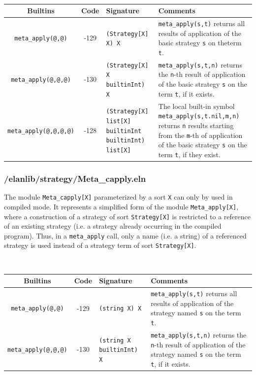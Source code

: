 ~\\
\begin{tabular}{|c|c|p{5cm}|p{5cm}|}
\hline
{\bf Builtins} & {\bf Code} & {\bf Signature} & {\bf Comments} \\
\hline
\hline
{\tt meta\_apply(@,@)}          & -129 & {\tt (Strategy[X] X) X} & {\tt meta\_apply(s,t)} returns all results of application of the basic strategy {\tt s} on theterm {\tt t}.\\
{\tt meta\_apply(@,@,@)}        & -130 & {\tt (Strategy[X] X builtinInt) X} & {\tt meta\_apply(s,t,n)} returns the {\tt n}-th result of application of the basic strategy {\tt s} on the term {\tt t}, if it exists.\\
{\tt meta\_apply(@,@,@,@)}      & -128 & {\tt (Strategy[X] list[X] builtinInt builtinInt) list[X]} & The local built-in symbol {\tt meta\_apply(s,t.nil,m,n)} returns {\tt n} results starting from the {\tt m}-th of application of the basic strategy {\tt s} on the term {\tt t}, if they exist.\\
\hline
\end{tabular}


\subsubsection{/elanlib/strategy/Meta\_capply.eln}


The module {\tt Meta\_capply[X]} parameterized by a sort {\tt X} can
only by used in compiled mode.  It represents a simplified form of the
module {\tt Meta\_apply[X]}, where a construction of a strategy of
sort {\tt Strategy[X]} is restricted to a reference of an existing
strategy (i.e. a strategy already occurring in the compiled program).
Thus, in a {\tt meta\_apply} call, only a name (i.e. a string) of a
referenced strategy is used instead of a strategy term of sort 
{\tt   Strategy[X]}.

~\\
\begin{tabular}{|c|c|p{4cm}|p{}|}
\hline
{\bf Builtins} & {\bf Code} & {\bf Signature} & {\bf Comments} \\
\hline
\hline
{\tt meta\_apply(@,@)}          & -129 & {\tt (string X) X} & {\tt meta\_apply(s,t)} returns all results of application of the strategy named {\tt s} on the term {\tt t}.\\
{\tt meta\_apply(@,@,@)}        & -130 & {\tt (string X builtinInt) X} & {\tt meta\_apply(s,t,n)} returns the {\tt n}-th result of application of the strategy named {\tt s} on the term {\tt t}, if it exists.\\
\hline
\end{tabular}




